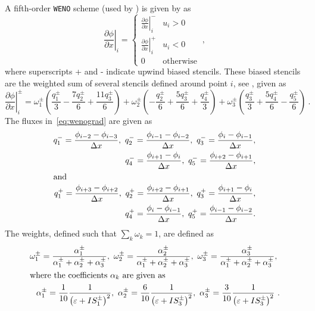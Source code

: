 \documentclass[11pt]{article}
\begin{document}
A fifth-order \texttt{WENO} scheme (used by \cite{McSherry2017}) is given by \cite{Croce2004} as
\begin{equation}
  \left. \frac{\partial \phi}{\partial x} \right|_i =
  \begin{cases}
    \left. \frac{\partial \phi}{\partial x} \right|^-_i & u_i > 0 \\
    \left. \frac{\partial \phi}{\partial x} \right|^+_i & u_i < 0 \\
    0 & \mbox{otherwise}
  \end{cases} \ ,
\end{equation}
where superscripts + and - indicate upwind biased stencils.
These biased stencils are the weighted sum of several stencils defined around point \(i\), see
\cite{Jiang1996}, given as
\begin{equation}
  \label{eq:wenograd}
  \left. \frac{\partial \phi}{\partial x} \right|^{\pm}_i = \omega^{\pm}_1 \left(
    \frac{q^{\pm}_1}{3} - \frac{7 q^{\pm}_2}{6} + \frac{11 q^{\pm}_3}{6} \right) +
  \omega^{\pm}_2 \left( -\frac{q^{\pm}_2}{6} + \frac{5 q^{\pm}_3}{6} + \frac{q^{\pm}_4}{3} \right) +
  \omega^{\pm}_3 \left( \frac{q^{\pm}_3}{3} + \frac{5 q^{\pm}_4}{6} - \frac{q^{\pm}_5}{6} \right) \ .
\end{equation}
The fluxes in~\eqref{eq:wenograd} are given as
\begin{align}
  \begin{split}
    q^-_1 = \frac{\phi_{i - 2} - \phi_{i - 3}}{\Delta x},\ q^-_2 = \frac{\phi_{i - 1} - \phi_{i -
        2}}{\Delta x},\ q^-_3 = \frac{\phi_i - \phi_{i - 1}}{\Delta x} , \\
    q^-_4 = \frac{\phi_{i+1} - \phi_i}{\Delta x},\ q^-_5 = \frac{\phi_{i+2} - \phi_{i+1}}{\Delta x},
  \end{split} \label{eq:q-} \\
  \intertext{and}
  \begin{split}
    q^+_1 = \frac{\phi_{i+3} - \phi_{i+2}}{\Delta x},\ q^+_2 = \frac{\phi_{i+2} - \phi_{i+1}}{\Delta
      x},\ q^+_3 = \frac{\phi_{i+1} - \phi_i}{\Delta x}, \\
    q^+_4 = \frac{\phi_i - \phi_{i - 1}}{\Delta x},\ q^+_5 = \frac{\phi_{i - 1} - \phi_{i -
        2}}{\Delta x}.
  \end{split} \label{eq:q+}
\end{align}
The weights, defined such that \(\sum_{k}\omega_{k}=1\), are defined as
\begin{align}
  \omega^{\pm}_1 = \frac{\alpha^{\pm}_1}{\alpha^{\pm}_1 + \alpha^{\pm}_2 + \alpha^{\pm}_3},\
  \omega^{\pm}_2 = \frac{\alpha^{\pm}_2}{\alpha^{\pm}_1 + \alpha^{\pm}_2 + \alpha^{\pm}_3},\
  \omega^{\pm}_3 = \frac{\alpha^{\pm}_3}{\alpha^{\pm}_1 + \alpha^{\pm}_2 + \alpha^{\pm}_3},\ \label{eq:weights}\\
  \intertext{where the coefficients $\alpha_k$ are given as}
  \alpha^{\pm}_1 = \frac{1}{10}\frac{1}{{\left( \varepsilon + IS^{\pm}_1 \right)}^2},\
  \alpha^{\pm}_2 = \frac{6}{10}\frac{1}{{\left( \varepsilon + IS^{\pm}_3 \right)}^2},\
  \alpha^{\pm}_3 = \frac{3}{10}\frac{1}{{\left( \varepsilon + IS^{\pm}_3 \right)}^2}\ . \label{eq:weight-coeffs}
\end{align}
\end{document}
